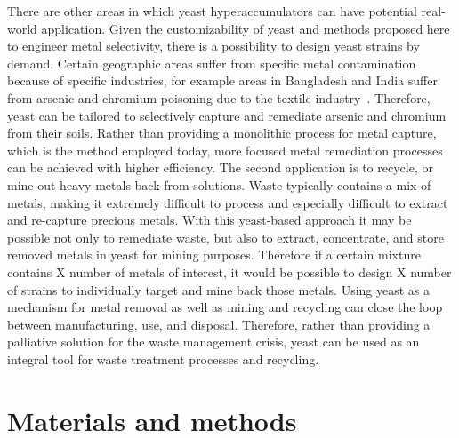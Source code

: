 \documentclass[../main/main]{subfiles}
\begin{document}
There are other areas in which yeast hyperaccumulators can have potential real-world application. Given the customizability of yeast and methods proposed here to engineer metal selectivity, there is a possibility to design yeast strains by demand. Certain geographic areas suffer from specific metal contamination because of specific industries, for example areas in Bangladesh and India suffer from arsenic and chromium poisoning due to the textile industry~\cite{robinson2001,manzoor2006}.
Therefore, yeast can be tailored to selectively capture and remediate arsenic and chromium from their soils. Rather than providing a monolithic process for metal capture, which is the method employed today, more focused metal remediation processes can be achieved with higher efficiency. The second application is to recycle, or mine out heavy metals back from solutions. Waste typically contains a mix of metals, making it extremely difficult to process and especially difficult to extract and re-capture precious metals. With this yeast-based approach it may be possible not only to remediate waste, but also to extract, concentrate, and store removed metals in yeast for mining purposes. Therefore if a certain mixture contains X number of metals of interest, it would be possible to design X number of strains to individually target and mine back those metals. Using yeast as a mechanism for metal removal as well as mining and recycling can close the loop between manufacturing, use, and disposal. Therefore, rather than providing a palliative solution for the waste management crisis, yeast can be used as an integral tool for waste treatment processes and recycling.

\section{Materials and methods}
\end{document}
